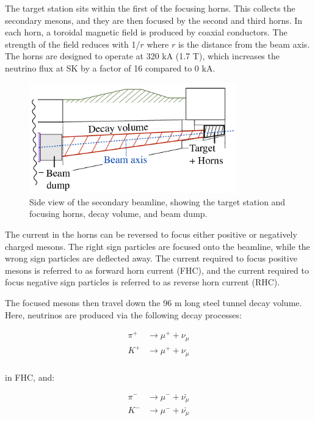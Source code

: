The target station sits within the first of the focusing horns. This collects the secondary mesons, and they are then focused by the second and third horns. In each horn, a toroidal magnetic field is produced by coaxial conductors. The strength of the field reduces with 1/$r$ where $r$ is the distance from the beam axis. The horns are designed to operate at 320 kA (1.7 T), which increases the neutrino flux at SK by a factor of 16 compared to 0 kA. 

\begin{figure}[!htbp]
\centering
\includegraphics*[width=0.8\textwidth,clip]{figs/secondarybeamline}
\caption{Side view of the secondary beamline, showing the target station and focusing horns, decay volume, and beam dump.} \label{secondarybeamline}
\end{figure}

The current in the horns can be reversed to focus either positive or negatively charged mesons. The right sign particles are focused onto the beamline, while the wrong sign particles are deflected away. The current required to focus positive mesons is referred to as forward horn current (FHC), and the current required to focus negative sign particles is referred to as reverse horn current (RHC). 

The focused mesons then travel down the 96 m long steel tunnel decay volume. Here, neutrinos are produced via the following decay processes: 

\begin{equation}
 \begin{aligned}
\pi^{+} &\rightarrow \mu^{+} + \nu_{\mu}\\
K^{+} &\rightarrow \mu^{+} + \nu_{\mu}\\
\end{aligned}
\end{equation}

in FHC, and:

\begin{equation}
\begin{aligned}
\pi^{-} &\rightarrow \mu^{-} + \bar{\nu_{\mu}}\\
K^{-} &\rightarrow \mu^{-} + \bar{\nu_{\mu}}\\
 \end{aligned}
\label{eqn:mesondecay}
\end{equation}

